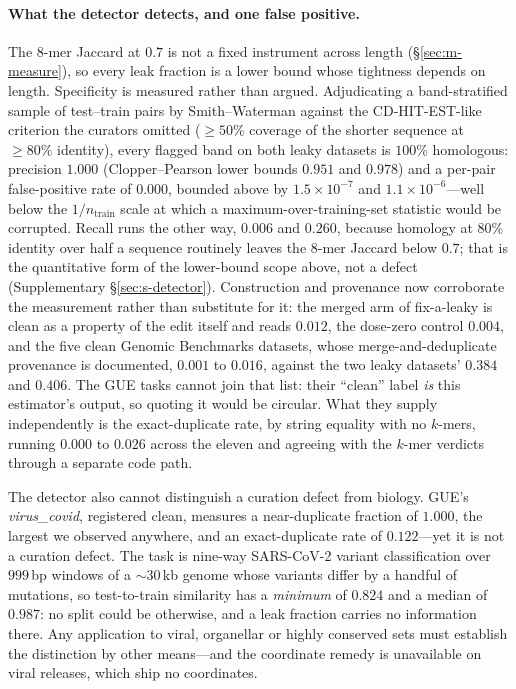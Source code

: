 \documentclass[webpdf,modern,large,namedate]{oup-authoring-template}%
\begin{document}
\paragraph{What the detector detects, and one false positive.}\label{sec:d-detector}
The $8$-mer Jaccard at $0.7$ is not a fixed instrument across length (\S\ref{sec:m-measure}), so every leak fraction is a lower bound whose tightness depends on length. Specificity is measured rather than argued. Adjudicating a band-stratified sample of test--train pairs by Smith--Waterman against the CD-HIT-EST-like criterion the curators omitted (${\ge}50\%$ coverage of the shorter sequence at ${\ge}80\%$ identity), every flagged band on both leaky datasets is $100\%$ homologous: precision $1.000$ (Clopper--Pearson lower bounds $0.951$ and $0.978$) and a per-pair false-positive rate of $0.000$, bounded above by $1.5\times10^{-7}$ and $1.1\times10^{-6}$---well below the $1/n_{\text{train}}$ scale at which a maximum-over-training-set statistic would be corrupted. Recall runs the other way, $0.006$ and $0.260$, because homology at $80\%$ identity over half a sequence routinely leaves the $8$-mer Jaccard below $0.7$; that is the quantitative form of the lower-bound scope above, not a defect (Supplementary \S\ref{sec:s-detector}). Construction and provenance now corroborate the measurement rather than substitute for it: the merged arm of fix-a-leaky is clean as a property of the edit itself and reads $0.012$, the dose-zero control $0.004$, and the five clean Genomic Benchmarks datasets, whose merge-and-deduplicate provenance is documented, $0.001$ to $0.016$, against the two leaky datasets' $0.384$ and $0.406$. The GUE tasks cannot join that list: their ``clean'' label \emph{is} this estimator's output, so quoting it would be circular. What they supply independently is the exact-duplicate rate, by string equality with no $k$-mers, running $0.000$ to $0.026$ across the eleven and agreeing with the $k$-mer verdicts through a separate code path.

The detector also cannot distinguish a curation defect from biology. GUE's \textit{virus\_covid}, registered clean, measures a near-duplicate fraction of $1.000$, the largest we observed anywhere, and an exact-duplicate rate of $0.122$---yet it is not a curation defect. The task is nine-way SARS-CoV-2 variant classification over $999$\,bp windows of a ${\sim}30$\,kb genome whose variants differ by a handful of mutations, so test-to-train similarity has a \emph{minimum} of $0.824$ and a median of $0.987$: no split could be otherwise, and a leak fraction carries no information there. Any application to viral, organellar or highly conserved sets must establish the distinction by other means---and the coordinate remedy is unavailable on viral releases, which ship no coordinates.
\end{document}
